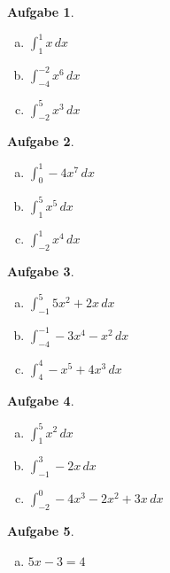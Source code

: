 \documentclass[12pt]{article}
\theoremstyle{note}
\newtheorem{aufgabe}{Aufgabe}
\begin{document}
\begin{flushleft}
\begin{aufgabe} ~ \ 
\begin{multicols}{3} 
\begin{enumerate}[a)] 
\item $\int_{1}^{1} x\, dx$
\item $\int_{-4}^{-2} x^{6}\, dx$
\item $\int_{-2}^{5} x^{3}\, dx$
\end{enumerate} 
\end{multicols} 
\end{aufgabe}\vspace{1em}\begin{aufgabe} ~ \ 
\begin{multicols}{3} 
\begin{enumerate}[a)] 
\item $\int_{0}^{1} - 4 x^{7}\, dx$
\item $\int_{1}^{5} x^{5}\, dx$
\item $\int_{-2}^{1} x^{4}\, dx$
\end{enumerate} 
\end{multicols} 
\end{aufgabe}\vspace{1em}\begin{aufgabe} ~ \ 
\begin{multicols}{3} 
\begin{enumerate}[a)] 
\item $\int_{-1}^{5} 5 x^{2} + 2 x\, dx$
\item $\int_{-4}^{-1} - 3 x^{4} - x^{2}\, dx$
\item $\int_{4}^{4} - x^{5} + 4 x^{3}\, dx$
\end{enumerate} 
\end{multicols} 
\end{aufgabe}\vspace{1em}\begin{aufgabe} ~ \ 
\begin{multicols}{3} 
\begin{enumerate}[a)] 
\item $\int_{1}^{5} x^{2}\, dx$
\item $\int_{-1}^{3} - 2 x\, dx$
\item $\int_{-2}^{0} - 4 x^{3} - 2 x^{2} + 3 x\, dx$
\end{enumerate} 
\end{multicols} 
\end{aufgabe}\vspace{1em}\begin{aufgabe} ~ \ 
\begin{multicols}{3} 
\begin{enumerate}[a)] 
\item $5 x - 3 = 4$\\


\end{enumerate}
\end{multicols}
\end{aufgabe}
\end{flushleft}
\end{document}
